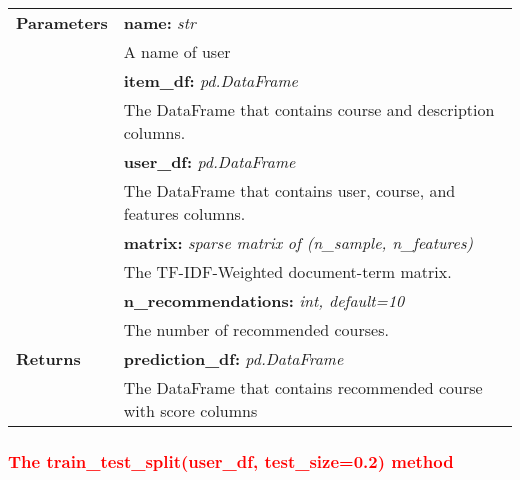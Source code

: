 \vspace{-7mm}
\begin{table}[H]
\small
\begin{tabularx}{\textwidth}{|p{2cm}|X|}
\hline
\textbf{Parameters} & \textbf{name:} \textit{str} \\ & \hspace{5mm} A name of user \\
& \textbf{item\_df:} \textit{pd.DataFrame} \\ & \hspace{5mm} The DataFrame that contains course and description columns. \\
& \textbf{user\_df:} \textit{pd.DataFrame} \\ & \hspace{5mm} The DataFrame that contains user, course, and features columns. \\
& \textbf{matrix:} \textit{sparse matrix of (n\_sample, n\_features)} \\ & \hspace{5mm} The TF-IDF-Weighted document-term matrix. \\
& \textbf{n\_recommendations:} \textit{int, default=10} \\ & \hspace{5mm} The number of recommended courses. \\
\textbf{Returns} & \textbf{prediction\_df:} \textit{pd.DataFrame} \\ & \hspace{5mm} The DataFrame that contains recommended course with score columns \\
\hline
\end{tabularx}
\end{table}

\subsubsection{\textcolor{red}{The train\_test\_split(user\_df, test\_size=0.2) method}}

